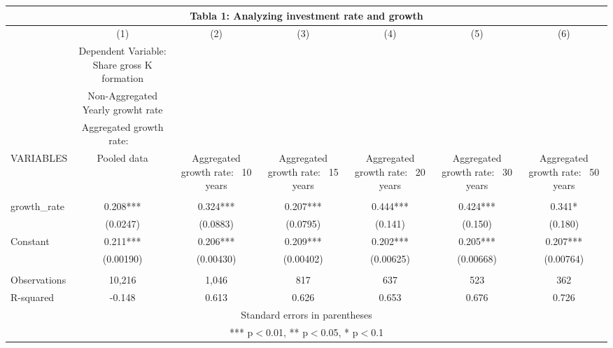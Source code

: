 \begin{tabular}{lcccccc}
\multicolumn{7}{c}{Tabla 1: Analyzing investment rate and growth} \\ \hline
 & (1) & (2) & (3) & (4) & (5) & (6) \\
 & Dependent Variable: Share gross K formation &  &  &  &  &  \\
 & Non-Aggregated Yearly growht rate &  &  &  &  &  \\
 & Aggregated growth rate: \ &  &  &  &  &  \\
VARIABLES & Pooled data & Aggregated growth rate: \ 10 years & Aggregated growth rate: \ 15 years & Aggregated growth rate: \ 20 years & Aggregated growth rate: \ 30 years & Aggregated growth rate: \ 50 years \\ \hline
 &  &  &  &  &  &  \\
growth\_rate & 0.208*** & 0.324*** & 0.207*** & 0.444*** & 0.424*** & 0.341* \\
 & (0.0247) & (0.0883) & (0.0795) & (0.141) & (0.150) & (0.180) \\
Constant & 0.211*** & 0.206*** & 0.209*** & 0.202*** & 0.205*** & 0.207*** \\
 & (0.00190) & (0.00430) & (0.00402) & (0.00625) & (0.00668) & (0.00764) \\
 &  &  &  &  &  &  \\
Observations & 10,216 & 1,046 & 817 & 637 & 523 & 362 \\
 R-squared & -0.148 & 0.613 & 0.626 & 0.653 & 0.676 & 0.726 \\ \hline
\multicolumn{7}{c}{ Standard errors in parentheses} \\
\multicolumn{7}{c}{ *** p$<$0.01, ** p$<$0.05, * p$<$0.1} \\
\end{tabular}
